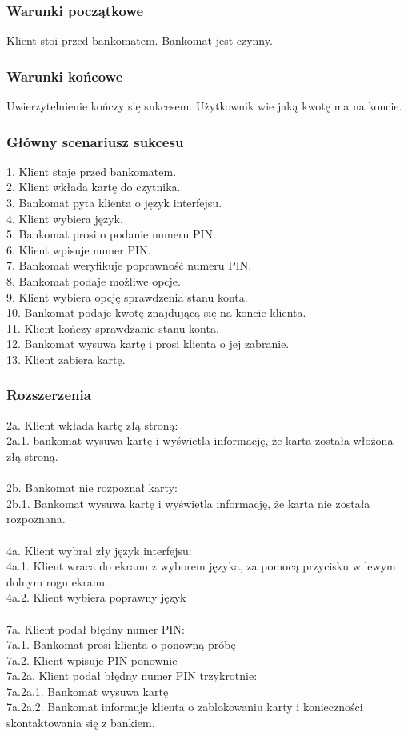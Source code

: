 \documentclass[10pt, a4paper]{article}
\begin{document}
\subsubsection*{Warunki początkowe}
Klient stoi przed bankomatem. Bankomat jest czynny.
\subsubsection*{Warunki końcowe}
Uwierzytelnienie kończy się sukcesem. Użytkownik wie jaką kwotę ma na koncie.
\subsubsection*{Główny scenariusz sukcesu}
1. Klient staje przed bankomatem. \\
2. Klient wkłada kartę do czytnika. \\
3. Bankomat pyta klienta o język interfejsu. \\ 
4. Klient wybiera język. \\
5. Bankomat prosi o podanie numeru PIN. \\
6. Klient wpisuje numer PIN. \\
7. Bankomat weryfikuje poprawność numeru PIN. \\ 
8. Bankomat podaje możliwe opcje. \\
9. Klient wybiera opcję sprawdzenia stanu konta. \\ 
10. Bankomat podaje kwotę znajdującą się na koncie klienta. \\
11. Klient kończy sprawdzanie stanu konta. \\
12. Bankomat wysuwa kartę i prosi klienta o jej zabranie. \\ 
13. Klient zabiera kartę. \\
\subsubsection*{Rozszerzenia}
2a. Klient wkłada kartę złą stroną: \\ 2a.1. bankomat wysuwa kartę i wyświetla informację, że karta została włożona złą stroną. \\ \\
2b. Bankomat nie rozpoznał karty: \\ 2b.1. Bankomat wysuwa kartę i wyświetla informację, że karta nie została rozpoznana. \\ \\
4a. Klient wybrał zły język interfejsu: \\4a.1. Klient wraca do ekranu z wyborem języka, za pomocą przycisku w lewym dolnym rogu ekranu. \\ 4a.2. Klient wybiera poprawny język \\ \\
7a. Klient podał błędny numer PIN: \\ 7a.1. Bankomat prosi klienta o ponowną próbę \\ 7a.2. Klient wpisuje PIN ponownie  \\ 7a.2a. Klient podał błędny numer PIN trzykrotnie: \\ 7a.2a.1. Bankomat wysuwa kartę \\ 7a.2a.2. Bankomat informuje klienta o zablokowaniu karty i konieczności skontaktowania się z bankiem. \\
\end{document}

